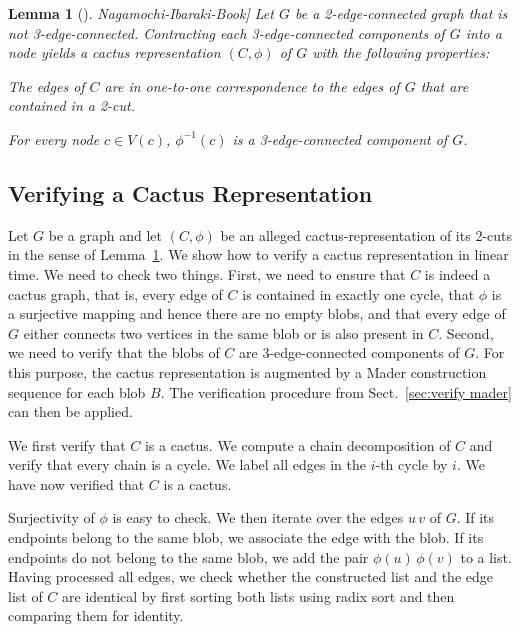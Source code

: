 \documentclass[paper=a4]{scrartcl}
\newtheorem{lemma}{Lemma}
\newcommand{\edge}[2]{\ensuremath{#1\,#2}}
\begin{document}
\newcommand{\citeNaga}{\cite[Section 2.3.5]{Nagamochi-Ibaraki-Book}}

\begin{lemma}[\citeNaga] \label{cactus representation} Let $G$ be a 2-edge-connected graph that is not 3-edge-connected. Contracting each 3-edge-connected components of $G$ into a node yields a cactus representation $(C,\phi)$ of $G$ with the following properties:
\begin{compactenum}[i)]
\item The edges of $C$ are in one-to-one correspondence to the edges of $G$ that are contained in a 2-cut.
\item For every node $c\in V(c)$, $\phi^{-1}(c)$ is a 3-edge-connected component of $G$.
\end{compactenum}
\end{lemma}





\subsection{Verifying a Cactus Representation}

Let $G$ be a graph and let $(C,\phi)$ be an alleged cactus-representation of its 2-cuts in the sense of Lemma~\ref{cactus representation}. We show how to verify a cactus representation in linear time. We need to check two things. First, we need to ensure that $C$ is indeed a cactus graph, that is, every edge of $C$ is contained in exactly one cycle, that $\phi$ is a surjective mapping and hence there are no empty blobs, and that every edge of $G$ either connects two vertices in the same blob or is also present in $C$. Second, we need to verify that the blobs of $C$ are $3$-edge-connected components of $G$. For this purpose, the cactus representation is augmented by a Mader construction sequence for each blob $B$. The verification procedure from Sect.~\ref{sec:verify mader} can then be applied.

We first verify that $C$ is a cactus. We compute a chain decomposition of $C$ and verify that every chain is a cycle. We label all edges in the $i$-th cycle by $i$. We have now verified that $C$ is a cactus.

Surjectivity of $\phi$ is easy to check. We then iterate over the edges $\edge uv$ of $G$. If its endpoints belong to the same blob, we associate the edge with the blob. If its endpoints do not belong to the same blob, we add the pair $\edge{\phi(u)}{\phi(v)}$ to a list. Having processed all edges, we check whether the constructed list and the edge list of $C$ are identical by first sorting both lists using radix sort and then comparing them for identity.
\end{document}
